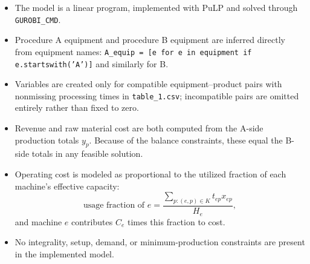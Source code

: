 \begin{itemize}
    \item The model is a linear program, implemented with PuLP and solved through \texttt{GUROBI\_CMD}.
    \item Procedure A equipment and procedure B equipment are inferred directly from equipment names: \texttt{A\_equip = [e for e in equipment if e.startswith('A')]} and similarly for B.
    \item Variables are created only for compatible equipment--product pairs with nonmissing processing times in \texttt{table\_1.csv}; incompatible pairs are omitted entirely rather than fixed to zero.
    \item Revenue and raw material cost are both computed from the A-side production totals $y_p$. Because of the balance constraints, these equal the B-side totals in any feasible solution.
    \item Operating cost is modeled as proportional to the utilized fraction of each machine's effective capacity:
    \[
    \text{usage fraction of }e
    =
    \frac{\sum_{p:(e,p)\in K} t_{ep}x_{ep}}{H_e},
    \]
    and machine $e$ contributes $C_e$ times this fraction to cost.
    \item No integrality, setup, demand, or minimum-production constraints are present in the implemented model.
\end{itemize}
